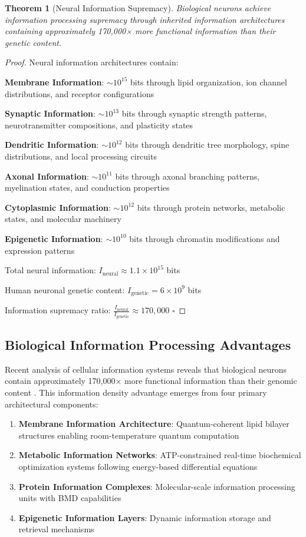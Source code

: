 \documentclass[12pt,a4paper]{article}
\newtheorem{theorem}{Theorem}[section]
\theoremstyle{remark}
\begin{document}
\begin{theorem}[Neural Information Supremacy]
Biological neurons achieve information processing supremacy through inherited information architectures containing approximately 170,000× more functional information than their genetic content.
\end{theorem}

\begin{proof}
Neural information architectures contain:

\textbf{Membrane Information}: $\sim 10^{15}$ bits through lipid organization, ion channel distributions, and receptor configurations

\textbf{Synaptic Information}: $\sim 10^{13}$ bits through synaptic strength patterns, neurotransmitter compositions, and plasticity states

\textbf{Dendritic Information}: $\sim 10^{12}$ bits through dendritic tree morphology, spine distributions, and local processing circuits

\textbf{Axonal Information}: $\sim 10^{11}$ bits through axonal branching patterns, myelination states, and conduction properties

\textbf{Cytoplasmic Information}: $\sim 10^{12}$ bits through protein networks, metabolic states, and molecular machinery

\textbf{Epigenetic Information}: $\sim 10^{10}$ bits through chromatin modifications and expression patterns

Total neural information: $I_{\text{neural}} \approx 1.1 \times 10^{15}$ bits

Human neuronal genetic content: $I_{\text{genetic}} = 6 \times 10^9$ bits

Information supremacy ratio: $\frac{I_{\text{neural}}}{I_{\text{genetic}}} \approx 170,000$ $\square$
\end{proof}

\subsection{Biological Information Processing Advantages}

Recent analysis of cellular information systems reveals that biological neurons contain approximately 170,000× more functional information than their genomic content \cite{sachikonye2024genome}. This information density advantage emerges from four primary architectural components:

\begin{enumerate}
\item \textbf{Membrane Information Architecture}: Quantum-coherent lipid bilayer structures enabling room-temperature quantum computation
\item \textbf{Metabolic Information Networks}: ATP-constrained real-time biochemical optimization systems following energy-based differential equations
\item \textbf{Protein Information Complexes}: Molecular-scale information processing units with BMD capabilities
\item \textbf{Epigenetic Information Layers}: Dynamic information storage and retrieval mechanisms
\end{enumerate}
\end{document}
